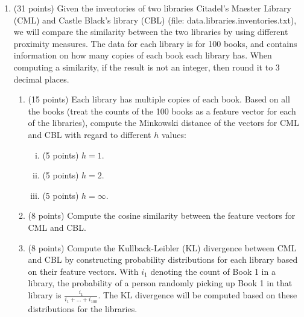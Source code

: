 \documentclass[11pt]{article}
\begin{document}
\begin{enumerate}
\item (31 points) Given the inventories of two libraries Citadel's Maester Library (CML) and Castle Black's library (CBL) (file: {\sf data.libraries.inventories.txt}), we will compare the similarity between the two libraries by using different proximity measures. The data for each library is for 100 books, and contains information on how many copies of each book each library has. When computing a similarity, 
if the result is not an integer, then round it to 3 decimal places.
\begin{enumerate}
\item (15 points) Each library has multiple copies of each book. Based on all the books (treat the counts of the 100 books as a feature vector for each of the libraries), compute the Minkowski distance of the vectors for CML and CBL with regard to different $h$ values:
\begin{enumerate}[(i)]
\item  (5 points) $h = 1$.
\item (5 points) $h=2$.
\item (5 points) $h = \infty$.
\end{enumerate}

\item (8 points) Compute the cosine similarity between the feature vectors for CML and CBL.

\item (8 points) Compute the Kullback-Leibler (KL) divergence between CML and CBL by constructing probability distributions for each library based on their feature vectors. With $i_1$ denoting the count of {\sf Book 1} in a library, the probability of a person randomly picking up {\sf Book 1} in that library is $\frac{i_1 }{i_1 + ... + i_{100}}$. The KL divergence will be computed based on these distributions for the libraries.
\end{enumerate}



\end{enumerate}
\end{document}
